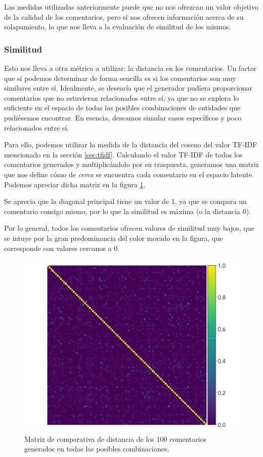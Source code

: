 Las medidas utilizadas anteriormente puede que no nos ofrezcan un valor objetivo de la calidad de los comentarios, pero sí nos ofrecen información acerca de su solapamiento, lo que nos lleva a la evaluación de similitud de los mismos.

\subsubsection{Similitud}
Esto nos lleva a otra métrica a utilizar: la distancia en los comentarios. Un factor que sí podemos determinar de forma sencilla es si los comentarios son muy similares entre sí. Idealmente, se desearía que el generador pudiera proporcionar comentarios que no estuvieran relacionados entre sí, ya que no se explora lo suficiente en el espacio de todas las posibles combinaciones de entidades que pudiésemos encontrar. En esencia, deseamos simular casos específicos y poco relacionados entre sí.

Para ello, podemos utilizar la medida de la distancia del coseno del valor TF-IDF mencionado en la sección \ref{sec:tfidf}. Calculando el valor TF-IDF de todos los comentarios generados y multiplicándolo por su traspuesta, generamos una matriz que nos define cómo de \textit{cerca} se encuentra cada comentario en el espacio latente. Podemos apreciar dicha matriz en la figura \ref{fig:conf-tfidf}. 

Se aprecia que la diagonal principal tiene un valor de 1, ya que se compara un comentario consigo mismo, por lo que la similitud es máxima (o la distancia 0).

Por lo general, todos los comentarios ofrecen valores de similitud muy bajos, que se intuye por la gran predominancia del color morado en la figura, que corresponde con valores cercanos a 0.

\begin{figure}[h]
	\centering
	\includegraphics[width=.6\textwidth]{media/conf_matrix_tfidf.pdf}
	\caption{Matriz de comparativa de distancia de los 100 comentarios generados en todas las posibles combinaciones.}
	\label{fig:conf-tfidf}
\end{figure}




